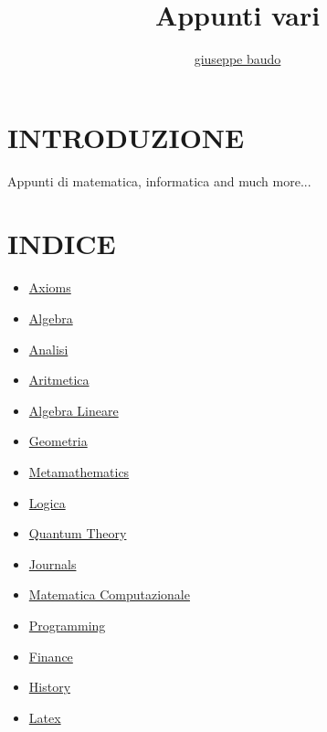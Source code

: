 \documentclass[a4paper,10pt]{article}
\title{Appunti vari}
\author{\href{http://www.baudo.hol.es}{giuseppe baudo}}
\begin{document}
\maketitle

\section{INTRODUZIONE}
Appunti di matematica, informatica and much more...

\section{INDICE}
\begin{itemize}
  \item \href{./Axioms.html}{Axioms}
  \item \href{./AlgebraIndex.html}{Algebra}
  \item \href{./Analisi.html}{Analisi} 
  \item \href{./Aritmetica.html}{Aritmetica}
  \item \href{./AlgebraLineare.html}{Algebra Lineare}
  \item \href{./Geometria.html}{Geometria}
  \item \href{./Metamathematics.html}{Metamathematics}
  \item \href{./Logics.html}{Logica}
  \item \href{./QuantumTheory.html}{Quantum Theory}
  \item \href{./Journals.html}{Journals}
  \item \href{./MatematicaComputazionale.html}{Matematica Computazionale}
  \item \href{./Programming.html}{Programming}
  \item \href{./finance.html}{Finance} 
  \item \href{./history.html}{History} 
  \item \href{./latex.html}{Latex} 
  
\end{itemize}
\end{document}
